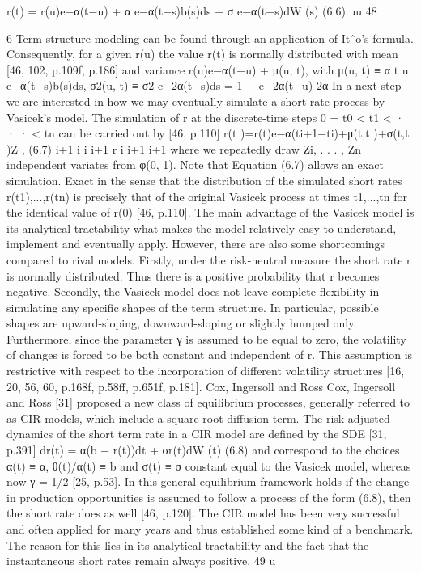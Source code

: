r(t) = r(u)e−α(t−u) + α e−α(t−s)b(s)ds + σ e−α(t−s)dW (s) (6.6) uu
48

6 Term structure modeling
can be found through an application of Itˆo’s formula. Consequently, for a given r(u) the value r(t) is normally distributed with mean [46, 102, p.109f, p.186]
and variance
r(u)e−α(t−u) + μ(u, t), with μ(u, t) ≡ α
t u
e−α(t−s)b(s)ds,
σ2(u, t) ≡ σ2
e−2α(t−s)ds =
1 − e−2α(t−u)
2α
In a next step we are interested in how we may eventually simulate a short rate process by
Vasicek’s model. The simulation of r at the discrete-time steps 0 = t0 < t1 < · · · < tn can be carried out by [46, p.110]
r(t )=r(t)e−α(ti+1−ti)+μ(t,t )+σ(t,t )Z , (6.7) i+1 i i i+1 r i i+1 i+1
where we repeatedly draw Zi, . . . , Zn independent variates from φ(0, 1). Note that Equation (6.7) allows an exact simulation. Exact in the sense that the distribution of the simulated short rates r(t1),...,r(tn) is precisely that of the original Vasicek process at times t1,...,tn for the identical value of r(0) [46, p.110].
The main advantage of the Vasicek model is its analytical tractability what makes the model relatively easy to understand, implement and eventually apply. However, there are also some shortcomings compared to rival models. Firstly, under the risk-neutral measure the short rate r is normally distributed. Thus there is a positive probability that r becomes negative. Secondly, the Vasicek model does not leave complete flexibility in simulating any specific shapes of the term structure. In particular, possible shapes are upward-sloping, downward-sloping or slightly humped only. Furthermore, since the parameter γ is assumed to be equal to zero, the volatility of changes is forced to be both constant and independent of r. This assumption is restrictive with respect to the incorporation of different volatility structures [16, 20, 56, 60, p.168f, p.58ff, p.651f, p.181].
Cox, Ingersoll and Ross
Cox, Ingersoll and Ross [31] proposed a new class of equilibrium processes, generally referred to as CIR models, which include a square-root diffusion term. The risk adjusted dynamics of the short term rate in a CIR model are defined by the SDE [31, p.391]
dr(t) = α(b − r(t))dt + σr(t)dW (t) (6.8)
and correspond to the choices α(t) ≡ α, θ(t)/α(t) ≡ b and σ(t) ≡ σ constant equal to the Vasicek model, whereas now γ = 1/2 [25, p.53]. In this general equilibrium framework holds if the change in production opportunities is assumed to follow a process of the form (6.8), then the short rate does as well [46, p.120]. The CIR model has been very successful and often applied for many years and thus established some kind of a benchmark. The reason for this lies in its analytical tractability and the fact that the instantaneous short rates remain always positive.
49
u


